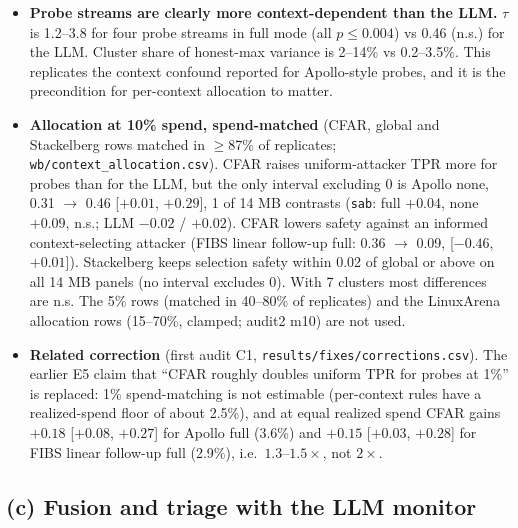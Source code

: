 \documentclass[11pt]{article}
\begin{document}
\begin{itemize}
\item \textbf{Probe streams are clearly more context-dependent than the LLM.} $\tau$ is 1.2--3.8 for four probe streams in full mode (all $p\le0.004$) vs 0.46 (n.s.) for the LLM. Cluster share of honest-max variance is 2--14\% vs 0.2--3.5\%. This replicates the context confound reported for Apollo-style probes, and it is the precondition for per-context allocation to matter.
\item \textbf{Allocation at 10\% spend, spend-matched} (CFAR, global and Stackelberg rows matched in $\ge$87\% of replicates; \nolinkurl{wb/context_allocation.csv}). CFAR raises uniform-attacker TPR more for probes than for the LLM, but the only interval excluding 0 is Apollo none, 0.31 $\to$ 0.46 [$+0.01$, $+0.29$], 1 of 14 MB contrasts (\texttt{sab}: full $+0.04$, none $+0.09$, n.s.; LLM $-0.02$ / $+0.02$). CFAR lowers safety against an informed context-selecting attacker (FIBS linear follow-up full: 0.36 $\to$ 0.09, [$-0.46$, $+0.01$]). Stackelberg keeps selection safety within 0.02 of global or above on all 14 MB panels (no interval excludes 0). With 7 clusters most differences are n.s. The 5\% rows (matched in 40--80\% of replicates) and the LinuxArena allocation rows (15--70\%, clamped; audit2 m10) are not used.
\item \textbf{Related correction} (first audit C1, \nolinkurl{results/fixes/corrections.csv}). The earlier E5 claim that ``CFAR roughly doubles uniform TPR for probes at 1\%'' is replaced: 1\% spend-matching is not estimable (per-context rules have a realized-spend floor of about 2.5\%), and at equal realized spend CFAR gains $+0.18$ [$+0.08$, $+0.27$] for Apollo full (3.6\%) and $+0.15$ [$+0.03$, $+0.28$] for FIBS linear follow-up full (2.9\%), i.e.\ $1.3$--$1.5\times$, not $2\times$.
\end{itemize}

\subsection{(c) Fusion and triage with the LLM monitor}
\end{document}
